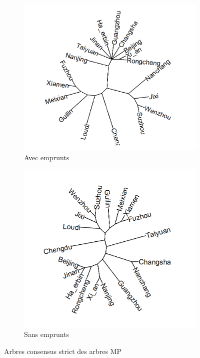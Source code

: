 \documentclass{scrbook}
\newcounter{c}[subsubsection]
\begin{document}
\begin{sloppypar}
\begin{figure}[htbp]
\flushleft
\begin{subfigure}{.5\textwidth}
\centering
\includegraphics[scale=.4]{Figure/MP_bab_sc_with}
\caption{Avec emprunts}
\end{subfigure}
\begin{subfigure}{.5\textwidth}
\centering
\includegraphics[scale=.4]{Figure/MP_bab_sc_without}
\caption{Sans emprunts}
\end{subfigure}
\caption{Arbres consensus strict des arbres MP}
\label{Fig:MPR_BAB}
\end{figure}


\end{sloppypar}
\end{document}
